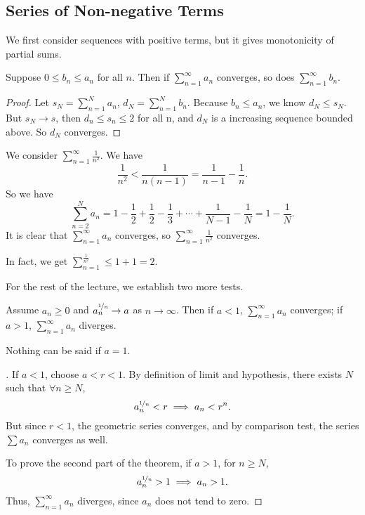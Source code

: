 \subsection{Series of Non-negative Terms}
We first consider sequences with positive terms, but it gives monotonicity of partial sums.
\begin{theorem}
    Suppose \(0\leq b_n\leq a_n\) for all \(n\). Then if \(\sum\limits_{n=1}^{\infty} a_n\) converges, so does \(\sum\limits_{n=1}^{\infty} b_n\).
\end{theorem}
\begin{proof}
    Let \(s_N = \sum\limits_{n=1}^{N} a_n\), \(d_N = \sum\limits_{n=1}^{N} b_n\). Because \(b_n \leq a_n\), we know \(d_N \leq s_N\). But \(s_N \to s\), then \(d_n \leq s_n \leq 2\) for all n, and \(d_N\) is a increasing sequence bounded above. So \(d_N\) converges.
\end{proof}
\begin{example}
    We consider \(\sum\limits_{n=1}^{\infty} \frac{1}{n^2}\). We have
    \[
        \frac{1}{n^2} < \frac{1}{n(n-1)} = \frac{1}{n - 1}-\frac{1}{n}.
    \]
    So we have
    \[
        \sum\limits_{n=2}^{N} a_n = 1 - \frac{1}{2} + \frac{1}{2}- \frac{1}{3}+\cdots+\frac{1}{N-1}-\frac{1}{N} = 1 - \frac{1}{N}.
    \]
    It is clear that \(\sum\limits_{n=1}^{\infty} a_n\) converges, so \(\sum\limits_{n=1}^{\infty} \frac{1}{n^{2}}\) converges.

    In fact, we get \(\sum\limits_{n=1}^{\frac{1}{n^2}} \leq 1 + 1 = 2\).
\end{example}
For the rest of the lecture, we establish two more tests.
\begin{theorem}
    Assume \(a_n \geq 0\) and \(a_n^{\nicefrac{1}{n}}\to a\) as \(n\to \infty\). Then if \(a<1\), \(\sum\limits_{n=1}^{\infty} a_n\) converges; if \(a>1\), \(\sum\limits_{n=1}^{\infty} a_n\) diverges.
\end{theorem}
\begin{remark}
    Nothing can be said if \(a=1\).
\end{remark}
\begin{proof}[]
    If \(a<1\), choose \(a<r<1\). By definition of limit and hypothesis, there exists \(N\) such that \(\forall n \geq N\),
    \[
        a_n^{\nicefrac{1}{n}}<r \implies a_n < r^n.
    \]
    But since \(r<1\), the geometric series converges, and by comparison test, the series \(\sum a_n\) converges as well.

    To prove the second part of the theorem, if \(a>1\), for \(n\geq N\),
    \[a_n^{\nicefrac{1}{n}}>1\implies a_n > 1.\]
    Thus, \(\sum\limits_{n=1}^{\infty} a_{n}\) diverges, since \(a_n\) does not tend to zero.
\end{proof}
